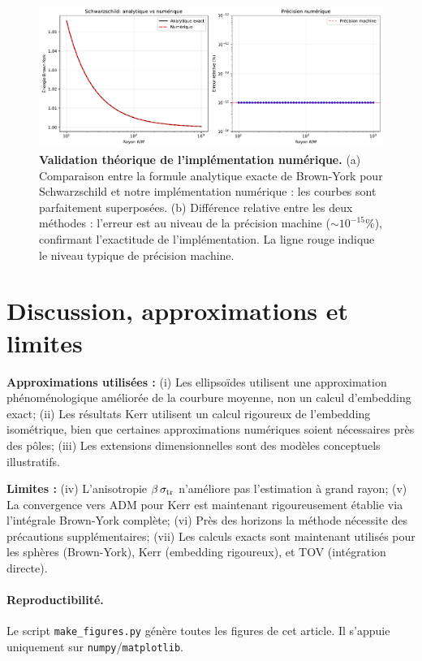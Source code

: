 \documentclass[11pt]{article}
\begin{document}
\begin{figure}[!htb]
\centering
\includegraphics[width=\linewidth]{fig_theoretical_comparison.pdf}
\caption{\textbf{Validation théorique de l'implémentation numérique.} (a) Comparaison entre la formule analytique exacte de Brown-York pour Schwarzschild et notre implémentation numérique : les courbes sont parfaitement superposées. (b) Différence relative entre les deux méthodes : l'erreur est au niveau de la précision machine ($\sim 10^{-15}\%$), confirmant l'exactitude de l'implémentation. La ligne rouge indique le niveau typique de précision machine.}
\end{figure}

\section{Discussion, approximations et limites}
\textbf{Approximations utilis\'ees :} 
(i) Les ellipso\"ides utilisent une approximation ph\'enom\'enologique am\'elior\'ee de la courbure moyenne, non un calcul d'embedding exact; 
(ii) Les r\'esultats Kerr utilisent un calcul rigoureux de l'embedding isom\'etrique, bien que certaines approximations num\'eriques soient n\'ecessaires pr\`es des p\^oles; 
(iii) Les extensions dimensionnelles sont des mod\`eles conceptuels illustratifs.

\textbf{Limites :} 
(iv) L'anisotropie $\beta\,\sigma_{\rm tr}$ n'am\'eliore pas l'estimation \`a grand rayon; 
(v) La convergence vers ADM pour Kerr est maintenant rigoureusement \'etablie via l'int\'egrale Brown-York compl\`ete; 
(vi) Pr\`es des horizons la m\'ethode n\'ecessite des pr\'ecautions suppl\'ementaires;
(vii) Les calculs exacts sont maintenant utilis\'es pour les sph\`eres (Brown-York), Kerr (embedding rigoureux), et TOV (int\'egration directe).

\paragraph{Reproductibilit\'e.}
Le script \texttt{make\_figures.py} g\'en\`ere toutes les figures de cet article. Il s'appuie uniquement sur \texttt{numpy}/\texttt{matplotlib}.
\end{document}
